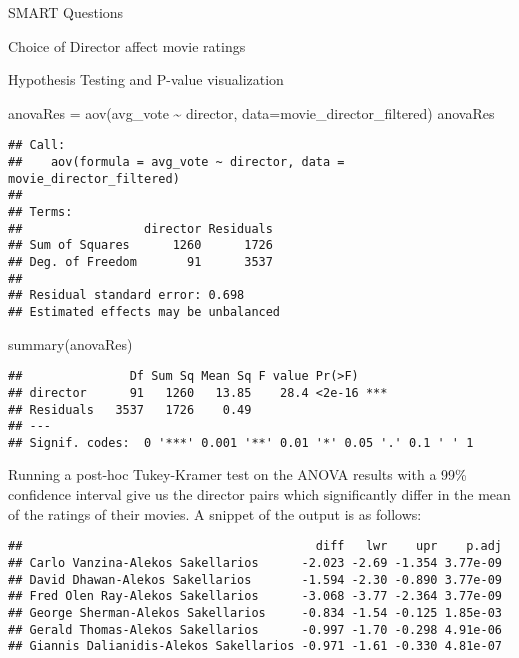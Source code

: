 \documentclass[
  ignorenonframetext,
]{beamer}
\newenvironment{Shaded}{\begin{snugshade}}{\end{snugshade}}
\newcommand{\AttributeTok}[1]{\textcolor[rgb]{0.77,0.63,0.00}{#1}}
\newcommand{\FloatTok}[1]{\textcolor[rgb]{0.00,0.00,0.81}{#1}}
\newcommand{\FunctionTok}[1]{\textcolor[rgb]{0.00,0.00,0.00}{#1}}
\newcommand{\NormalTok}[1]{#1}
\newcommand{\OtherTok}[1]{\textcolor[rgb]{0.56,0.35,0.01}{#1}}
\newcommand{\SpecialCharTok}[1]{\textcolor[rgb]{0.00,0.00,0.00}{#1}}
\begin{document}
\begin{frame}[fragile]{SMART Questions}
\begin{block}{Choice of Director affect movie ratings}
\begin{block}{Hypothesis Testing and P-value visualization}
\begin{Shaded}
\begin{Highlighting}[]
\NormalTok{anovaRes }\OtherTok{=} \FunctionTok{aov}\NormalTok{(avg\_vote }\SpecialCharTok{\textasciitilde{}}\NormalTok{ director, }\AttributeTok{data=}\NormalTok{movie\_director\_filtered)}
\NormalTok{anovaRes }
\end{Highlighting}
\end{Shaded}

\begin{verbatim}
## Call:
##    aov(formula = avg_vote ~ director, data = movie_director_filtered)
## 
## Terms:
##                 director Residuals
## Sum of Squares      1260      1726
## Deg. of Freedom       91      3537
## 
## Residual standard error: 0.698
## Estimated effects may be unbalanced
\end{verbatim}

\begin{Shaded}
\begin{Highlighting}[]
\FunctionTok{summary}\NormalTok{(anovaRes)}
\end{Highlighting}
\end{Shaded}

\begin{verbatim}
##               Df Sum Sq Mean Sq F value Pr(>F)    
## director      91   1260   13.85    28.4 <2e-16 ***
## Residuals   3537   1726    0.49                   
## ---
## Signif. codes:  0 '***' 0.001 '**' 0.01 '*' 0.05 '.' 0.1 ' ' 1
\end{verbatim}

Running a post-hoc Tukey-Kramer test on the ANOVA results with a 99\%
confidence interval give us the director pairs which significantly
differ in the mean of the ratings of their movies. A snippet of the
output is as follows:

\begin{Shaded}
\end{Shaded}

\begin{verbatim}
##                                         diff   lwr    upr    p.adj
## Carlo Vanzina-Alekos Sakellarios      -2.023 -2.69 -1.354 3.77e-09
## David Dhawan-Alekos Sakellarios       -1.594 -2.30 -0.890 3.77e-09
## Fred Olen Ray-Alekos Sakellarios      -3.068 -3.77 -2.364 3.77e-09
## George Sherman-Alekos Sakellarios     -0.834 -1.54 -0.125 1.85e-03
## Gerald Thomas-Alekos Sakellarios      -0.997 -1.70 -0.298 4.91e-06
## Giannis Dalianidis-Alekos Sakellarios -0.971 -1.61 -0.330 4.81e-07
\end{verbatim}


\end{block}
\end{block}
\end{frame}
\end{document}
